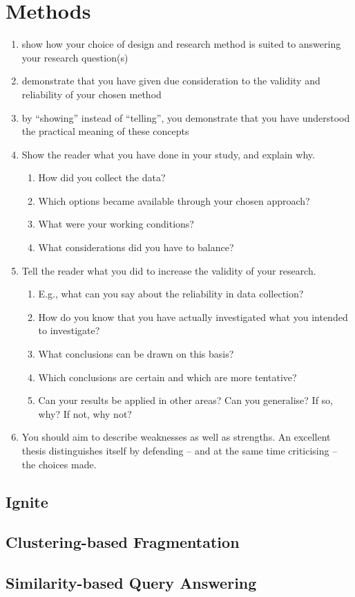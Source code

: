 
\section{Methods}
\label{sec:meth}
 
 \begin{enumerate}
     \item show how your choice of design and research method is suited to answering your research question(s)
     \item demonstrate that you have given due consideration to the validity and reliability of your chosen method
     \item by “showing” instead of “telling”, you demonstrate that you have understood the practical meaning of these concepts
     \item Show the reader what you have done in your study, and explain why. 
     \begin{enumerate}
         \item How did you collect the data? 
         \item Which options became available through your chosen approach?
         \item What were your working conditions? 
         \item What considerations did you have to balance?
     \end{enumerate}
    \item Tell the reader what you did to increase the validity of your research. 
    \begin{enumerate}
        \item E.g., what can you say about the reliability in data collection? 
        \item How do you know that you have actually investigated what you intended to investigate? 
        \item What conclusions can be drawn on this basis? 
        \item Which conclusions are certain and which are more tentative?
        \item Can your results be applied in other areas? Can you generalise? If so, why? If not, why not?
    \end{enumerate}
    \item You should aim to describe weaknesses as well as strengths. An excellent thesis distinguishes itself by defending – and at the same time criticising – the choices made.
 \end{enumerate}
 
 
 \subsection{Ignite}
 
 \subsection{Clustering-based Fragmentation}
 
 \subsection{Similarity-based Query Answering}